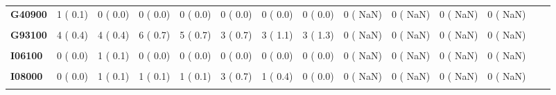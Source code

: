 \documentclass[
]{article}
\begin{document}
\begin{table}[H]
\begin{tabular}[t]{>{\raggedright\arraybackslash}p{5em}ccccccccccccc}
\textbf{G40900} & 1 (  0.1) & 0 (  0.0) & 0 (  0.0) & 0 (  0.0) & 0 (  0.0) & 0 (  0.0) & 0 (  0.0) & 0 (  NaN) & 0 (  NaN) & 0 (  NaN) & 0 (  NaN) &  & \\
\textbf{\cellcolor{gray!10}{G62900}} & \cellcolor{gray!10}{0 (  0.0)} & \cellcolor{gray!10}{0 (  0.0)} & \cellcolor{gray!10}{1 (  0.1)} & \cellcolor{gray!10}{0 (  0.0)} & \cellcolor{gray!10}{0 (  0.0)} & \cellcolor{gray!10}{0 (  0.0)} & \cellcolor{gray!10}{0 (  0.0)} & \cellcolor{gray!10}{0 (  NaN)} & \cellcolor{gray!10}{0 (  NaN)} & \cellcolor{gray!10}{0 (  NaN)} & \cellcolor{gray!10}{0 (  NaN)} & \cellcolor{gray!10}{} & \cellcolor{gray!10}{}\\
\textbf{G93100} & 4 (  0.4) & 4 (  0.4) & 6 (  0.7) & 5 (  0.7) & 3 (  0.7) & 3 (  1.1) & 3 (  1.3) & 0 (  NaN) & 0 (  NaN) & 0 (  NaN) & 0 (  NaN) &  & \\
\textbf{\cellcolor{gray!10}{I05900}} & \cellcolor{gray!10}{1 (  0.1)} & \cellcolor{gray!10}{1 (  0.1)} & \cellcolor{gray!10}{0 (  0.0)} & \cellcolor{gray!10}{1 (  0.1)} & \cellcolor{gray!10}{0 (  0.0)} & \cellcolor{gray!10}{0 (  0.0)} & \cellcolor{gray!10}{1 (  0.4)} & \cellcolor{gray!10}{0 (  NaN)} & \cellcolor{gray!10}{0 (  NaN)} & \cellcolor{gray!10}{0 (  NaN)} & \cellcolor{gray!10}{0 (  NaN)} & \cellcolor{gray!10}{} & \cellcolor{gray!10}{}\\
\textbf{I06100} & 0 (  0.0) & 1 (  0.1) & 0 (  0.0) & 0 (  0.0) & 0 (  0.0) & 0 (  0.0) & 0 (  0.0) & 0 (  NaN) & 0 (  NaN) & 0 (  NaN) & 0 (  NaN) &  & \\
\textbf{\cellcolor{gray!10}{I07100}} & \cellcolor{gray!10}{0 (  0.0)} & \cellcolor{gray!10}{1 (  0.1)} & \cellcolor{gray!10}{0 (  0.0)} & \cellcolor{gray!10}{1 (  0.1)} & \cellcolor{gray!10}{0 (  0.0)} & \cellcolor{gray!10}{0 (  0.0)} & \cellcolor{gray!10}{0 (  0.0)} & \cellcolor{gray!10}{0 (  NaN)} & \cellcolor{gray!10}{0 (  NaN)} & \cellcolor{gray!10}{0 (  NaN)} & \cellcolor{gray!10}{0 (  NaN)} & \cellcolor{gray!10}{} & \cellcolor{gray!10}{}\\
\textbf{I08000} & 0 (  0.0) & 1 (  0.1) & 1 (  0.1) & 1 (  0.1) & 3 (  0.7) & 1 (  0.4) & 0 (  0.0) & 0 (  NaN) & 0 (  NaN) & 0 (  NaN) & 0 (  NaN) &  & \\
\textbf{\cellcolor{gray!10}{I08100}} & \cellcolor{gray!10}{0 (  0.0)} & \cellcolor{gray!10}{3 (  0.3)} & \cellcolor{gray!10}{1 (  0.1)} & \cellcolor{gray!10}{0 (  0.0)} & \cellcolor{gray!10}{0 (  0.0)} & \cellcolor{gray!10}{0 (  0.0)} & \cellcolor{gray!10}{0 (  0.0)} & \cellcolor{gray!10}{0 (  NaN)} & \cellcolor{gray!10}{0 (  NaN)} & \cellcolor{gray!10}{0 (  NaN)} & \cellcolor{gray!10}{0 (  NaN)} & \cellcolor{gray!10}{} & \cellcolor{gray!10}{}\\

\end{tabular}
\end{table}
\end{document}
